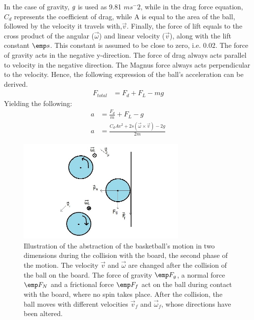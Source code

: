 \documentclass[twocolumn]{IEEEtran}
\begin{document}
In the case of gravity, $\emph g$ is used as 9.81 $ms^-2$, while in the drag force equation, $C_d$ represents the coefficient of drag, while A is equal to the area of the ball, followed by the velocity it travels with,$\vec v$. Finally, the force of lift equals to the cross product of the angular ($\vec \omega$) and linear velocity ($\vec v$), along with the lift constant $\emp s$. This constant is assumed to be close to zero, i.e. 0.02. The force of gravity acts in the negative y-direction. The force of drag always acts parallel to velocity in the negative direction. The Magnus force always acts perpendicular to the velocity. Hence, the following expression of the ball's acceleration can be derived.
\begin{align}
F_{total} &= F_d + F_L -mg
\end{align}
Yielding the following:
\begin{align}
a &= \frac{F_d}{m} + F_L -g\\
a &= \frac{C_d Av^2+2 s (\vec \omega \times \vec v)-2g}{2m}
\end{align}
\begin{figure}[!ht]
\includegraphics[height=2in]{basket}
\caption{Illustration of the abstraction of the basketball's motion in two dimensions during the collision with the board, the second phase of the motion. The velocity $\vec v$ and $\vec \omega$ are changed after the collision of the ball on the board. The force of gravity $\emp F_g$, a normal force $\emp F_N$ and a frictional force $\emp F_f$ act on the ball during contact with the board, where no spin takes place. After the collision, the ball moves with different velocities  $\vec v_f$ and $\vec \omega_f$, whose directions have been altered.}
\end{figure}
\end{document}
